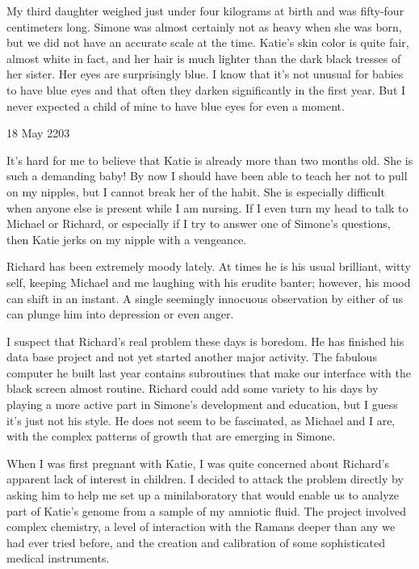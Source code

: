 \documentclass[]{article}
\begin{document}
My third daughter weighed just under four kilograms at birth and was fifty-four centimeters long.  Simone was almost certainly not as heavy when she was born, but we did not have an accurate scale at the time.  Katie’s skin color is quite fair, almost white in fact, and her hair is much lighter than the dark black tresses of her sister.  Her eyes are surprisingly blue.  I know that it’s not unusual for babies to have blue eyes and that often they darken significantly in the first year.  But I never expected a child of mine to have blue eyes for even a moment.

18 May 2203

It’s hard for me to believe that Katie is already more than two months old.  She is such a demanding baby! By now I should have been able to teach her not to pull on my nipples, but I cannot break her of the habit.  She is especially difficult when anyone else is present while I am nursing.  If I even turn my head to talk to Michael or Richard, or especially if I try to answer one of Simone’s questions, then Katie jerks on my nipple with a vengeance.

Richard has been extremely moody lately.  At times he is his usual brilliant, witty self, keeping Michael and me laughing with his erudite banter; however, his mood can shift in an instant.  A single seemingly innocuous observation by either of us can plunge him into depression or even anger.

I suspect that Richard’s real problem these days is boredom.  He has finished his data base project and not yet started another major activity.  The fabulous computer he built last year contains subroutines that make our interface with the black screen almost routine.  Richard could add some variety to his days by playing a more active part in Simone’s development and education, but I guess it’s just not his style.  He does not seem to be fascinated, as Michael and I are, with the complex patterns of growth that are emerging in Simone.

When I was first pregnant with Katie, I was quite concerned about Richard’s apparent lack of interest in children.  I decided to attack the problem directly by asking him to help me set up a minilaboratory that would enable us to analyze part of Katie’s genome from a sample of my amniotic fluid.  The project involved complex chemistry, a level of interaction with the Ramans deeper than any we had ever tried before, and the creation and calibration of some sophisticated medical instruments.
\end{document}
